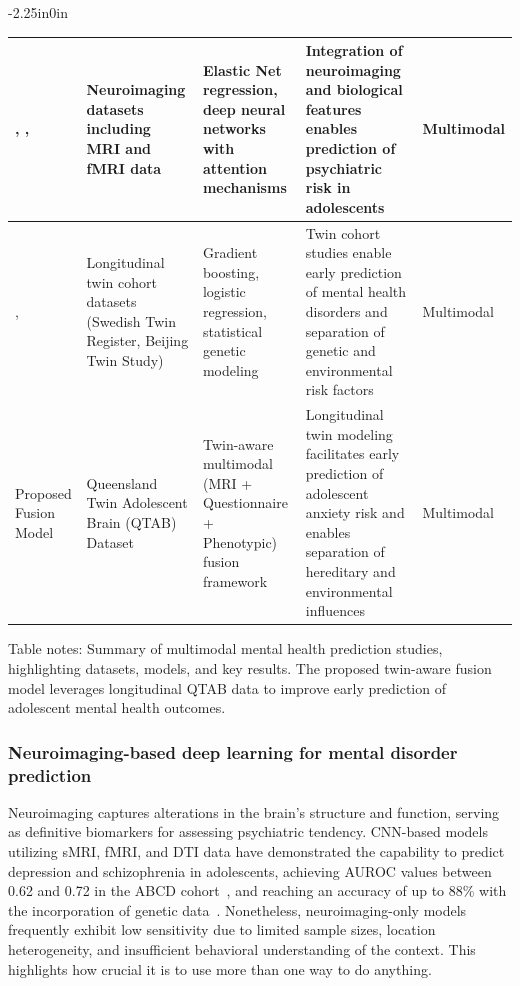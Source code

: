 \documentclass[10pt,letterpaper]{article}
\begin{document}
\begin{table}[!t]
\begin{adjustwidth}{-2.25in}{0in}
\begin{tabular}{|p{2.0cm}|p{3.5cm}|p{3.8cm}|p{4.8cm}|p{1.8cm}|}
        \cite{ref23}, \cite{ref25}, \cite{ref46}
        & Neuroimaging datasets including MRI and fMRI data
        & Elastic Net regression, deep neural networks with attention mechanisms
        & Integration of neuroimaging and biological features enables prediction of psychiatric risk in adolescents
        & Multimodal \\
        \hline

        \cite{ref33}, \cite{ref34}
        & Longitudinal twin cohort datasets (Swedish Twin Register, Beijing Twin Study)
        & Gradient boosting, logistic regression, statistical genetic modeling
        & Twin cohort studies enable early prediction of mental health disorders and separation of genetic and environmental risk factors
        & Multimodal \\
        \hline

        Proposed Fusion Model
        & Queensland Twin Adolescent Brain (QTAB) Dataset~\cite{ref31,ref32}
        & Twin-aware multimodal (MRI + Questionnaire + Phenotypic) fusion framework
        & Longitudinal twin modeling facilitates early prediction of adolescent anxiety risk and enables separation of hereditary and environmental influences
        & Multimodal \\
        \hline

        \end{tabular}

        \begin{flushleft}
        Table notes: Summary of multimodal mental health prediction studies, highlighting datasets, models, and key results. The proposed twin-aware fusion model leverages longitudinal QTAB data to improve early prediction of adolescent mental health outcomes.
        \end{flushleft}

        \end{adjustwidth}
        \end{table}

        \subsubsection*{Neuroimaging-based deep learning for mental disorder prediction}

        Neuroimaging captures alterations in the brain's structure and function, serving as definitive biomarkers for assessing psychiatric tendency. CNN-based models utilizing sMRI, fMRI, and DTI data have demonstrated the capability to predict depression and schizophrenia in adolescents, achieving AUROC values between 0.62 and 0.72 in the ABCD cohort~\cite{ref23}, and reaching an accuracy of up to 88\% with the incorporation of genetic data~\cite{ref25}. Nonetheless, neuroimaging-only models frequently exhibit low sensitivity due to limited sample sizes, location heterogeneity, and insufficient behavioral understanding of the context. This highlights how crucial it is to use more than one way to do anything.
\end{document}
